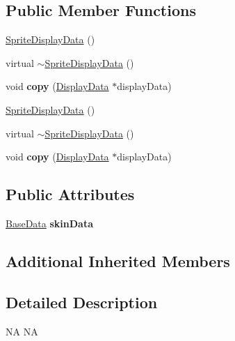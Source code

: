 \subsection*{Public Member Functions}
\begin{DoxyCompactItemize}
\item 
\hyperlink{classcocostudio_1_1SpriteDisplayData_a07e3f3a6398cc7ff14460bd9d1e10959}{Sprite\+Display\+Data} ()
\item 
virtual \hyperlink{classcocostudio_1_1SpriteDisplayData_a84423549b21b67a0bdc73a41052e706c}{$\sim$\+Sprite\+Display\+Data} ()
\item 
\mbox{\label{classcocostudio_1_1SpriteDisplayData_a313167470daac70c3233e7153a475a37}} 
void {\bfseries copy} (\hyperlink{classcocostudio_1_1DisplayData}{Display\+Data} $\ast$display\+Data)
\item 
\hyperlink{classcocostudio_1_1SpriteDisplayData_a07e3f3a6398cc7ff14460bd9d1e10959}{Sprite\+Display\+Data} ()
\item 
virtual \hyperlink{classcocostudio_1_1SpriteDisplayData_a84423549b21b67a0bdc73a41052e706c}{$\sim$\+Sprite\+Display\+Data} ()
\item 
\mbox{\label{classcocostudio_1_1SpriteDisplayData_a313167470daac70c3233e7153a475a37}} 
void {\bfseries copy} (\hyperlink{classcocostudio_1_1DisplayData}{Display\+Data} $\ast$display\+Data)
\end{DoxyCompactItemize}
\subsection*{Public Attributes}
\begin{DoxyCompactItemize}
\item 
\mbox{\label{classcocostudio_1_1SpriteDisplayData_a3bb8544fe9a0d83a5e34b2cd94e1fce7}} 
\hyperlink{classcocostudio_1_1BaseData}{Base\+Data} {\bfseries skin\+Data}
\end{DoxyCompactItemize}
\subsection*{Additional Inherited Members}


\subsection{Detailed Description}
NA  NA 

